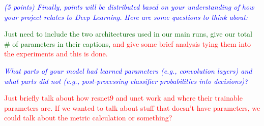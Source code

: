 \documentclass[10pt,twocolumn,letterpaper]{article}
\begin{document}
\textit{\textcolor{blue}{(5 points) Finally, points will be distributed based on your understanding of how your project relates to Deep Learning. Here are some questions to think about:}}

\textcolor{darkgreen}{Just need to include the two architectures used in our main runs, give our total \# of parameters in their captions, \textcolor{red}{and give some brief analysis tying them into the experiments and this is done.}}

%

\textit{\textcolor{blue}{What parts of your model had learned parameters (e.g., convolution layers) and what parts did not (e.g., post-processing classifier probabilities into decisions)? }}

\textcolor{red}{Just briefly talk about how resnet9 and unet work and where their trainable parameters are. If we wanted to talk about stuff that doesn't have parameters, we could talk about the metric calculation or something?}

%

%

%

%

\end{document}

